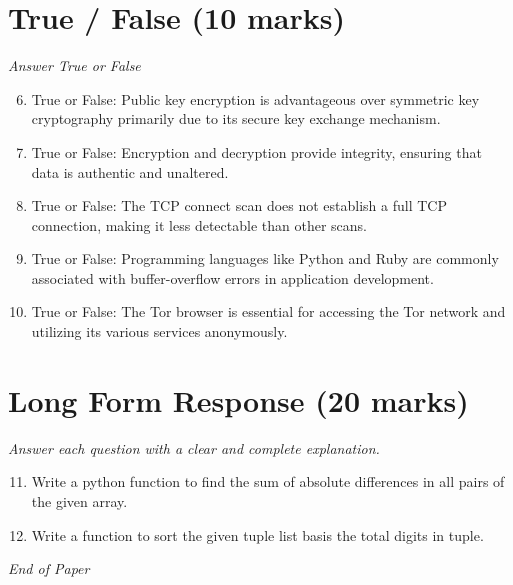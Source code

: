 \documentclass[12pt]{article}
\begin{document}
\section*{True / False (10 marks)}
\textit{Answer True or False}
\begin{enumerate}[label=\arabic*.]
\setcounter{enumi}{5}
\item True or False: Public key encryption is advantageous over symmetric key cryptography primarily due to its secure key exchange mechanism.
\item True or False: Encryption and decryption provide integrity, ensuring that data is authentic and unaltered.
\item True or False: The TCP connect scan does not establish a full TCP connection, making it less detectable than other scans.
\item True or False: Programming languages like Python and Ruby are commonly associated with buffer-overflow errors in application development.
\item True or False: The Tor browser is essential for accessing the Tor network and utilizing its various services anonymously.
\end{enumerate}

\section*{Long Form Response (20 marks)}
\textit{Answer each question with a clear and complete explanation.}
\begin{enumerate}[label=\arabic*.]
\setcounter{enumi}{10}
\item Write a python function to find the sum of absolute differences in all pairs of the given array.
\item Write a function to sort the given tuple list basis the total digits in tuple.
\end{enumerate}

\vfill
\noindent\textit{End of Paper}
\end{document}
